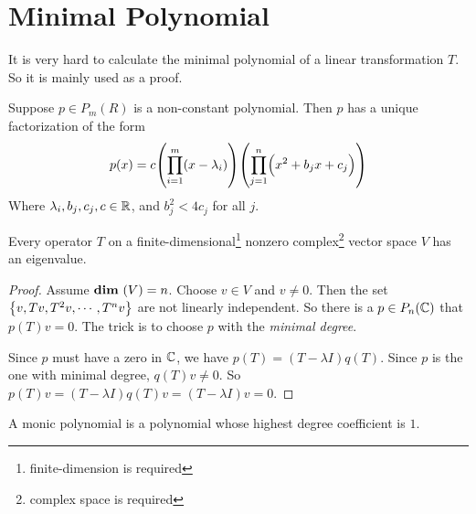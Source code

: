 \section{Minimal Polynomial}\label{minimal_polynomial}

It is very hard to calculate the minimal polynomial of a linear transformation $T$. So it is mainly used as a proof.

\begin{theorem}
    Suppose $p \in P_m(R)$ is a non-constant polynomial. Then $p$ has a unique factorization of the form
    \begin{equation}
        p(x) = c \mleft( \prod_{i=1}^m \mleft(x - \lambda_i\mright) \mright) \mleft( \prod_{j=1}^n \mleft(x^2 + b_j x + c_j\mright) \mright)
    \end{equation}
    Where $\lambda_i, b_j, c_j, c \in \mathbb{R}$, and $b_j^2 < 4 c_j$ for all $j$.
\end{theorem}


\begin{theorem}
    Every operator $T$ on a finite-dimensional\footnote{finite-dimension is required} nonzero complex\footnote{complex space is required} vector space $V$ has an eigenvalue.
\end{theorem}
\begin{proof}
    Assume $\dimension{V} = n$. Choose $v \in V$ and $v \neq 0$. Then the set $\set{v, Tv, T^2v, \cdots, T^nv}$ are not linearly independent. So there is a $p \in P_n(\mathbb{C})$ that $p(T) v = 0$. The trick is to choose $p$ with the \emph{minimal degree}.
    
    
    Since $p$ must have a zero in $\mathbb{C}$, we have $p(T) = (T - \lambda I) q(T)$. Since $p$ is the one with minimal degree, $q(T)v \neq 0$. So $p(T) v = (T - \lambda I) q(T) v = (T - \lambda I) v = 0$.
\end{proof}

\begin{definition}
    A monic polynomial is a polynomial whose highest degree coefficient is $1$.
\end{definition}

